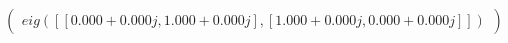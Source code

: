 \documentclass[border=1em]{standalone}
\begin{document}
$
\left(
\begin{array}{cc}
eig([[0.000+0.000j, 1.000+0.000j],[1.000+0.000j, 0.000+0.000j]])
\end{array}
\right)
$
\end{document}

